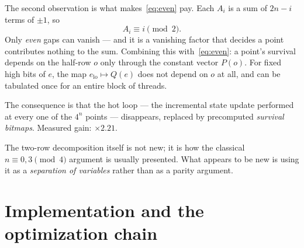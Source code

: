 \documentclass[11pt,a4paper]{article}
\begin{document}
\begin{center}
\end{center}

The second observation is what makes~\eqref{eq:even} pay. Each $A_i$ is a sum of
$2n-i$ terms of $\pm 1$, so
\[
  A_i \equiv i \pmod 2 .
\]
Only \emph{even} gaps can vanish --- and it is a vanishing factor that decides a
point contributes nothing to the sum. Combining this with~\eqref{eq:even}: a
point's survival depends on the half-row $o$ only through the constant vector
$P(o)$. For fixed high bits of $e$, the map $e_{\mathrm{lo}} \mapsto Q(e)$ does
not depend on $o$ at all, and can be tabulated once for an entire block of
threads.

The consequence is that the hot loop --- the incremental state update performed
at every one of the $4^n$ points --- disappears, replaced by precomputed
\emph{survival bitmaps}. Measured gain: $\times 2.21$.

The two-row decomposition itself is not new; it is how the classical
$n \equiv 0,3 \pmod 4$ argument is usually presented. What appears to be new is
using it as a \emph{separation of variables} rather than as a parity argument.

\section{Implementation and the optimization chain}
\end{document}
